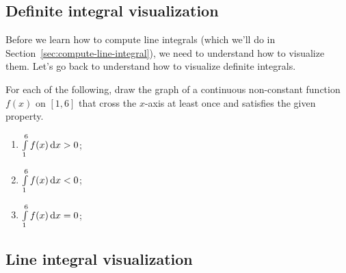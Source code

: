 \pagebreak 

\subsection{Definite integral visualization}
Before we learn how to compute line integrals (which we'll do in Section~\ref{sec:compute-line-integral}), we need to understand how to visualize them. Let's go back to understand how to visualize definite integrals.

\begin{ex}
    For each of the following, draw the graph of a continuous non-constant function $f(x)$ on $[1,6]$ that cross the $x$-axis at least once and satisfies the given property.
    \begin{multicols}{3} 
        \begin{enumerate}
            \item $\int\limits_1^{6}f(x)\mathop{}\!\mathrm{d} x>0$;
            \item $\int\limits_1^{6}f(x)\mathop{}\!\mathrm{d} x<0$;
            \item $\int\limits_1^{6}f(x)\mathop{}\!\mathrm{d} x=0$;
        \end{enumerate}
    \end{multicols}
\end{ex}

\vfill

\subsection{Line integral visualization}

